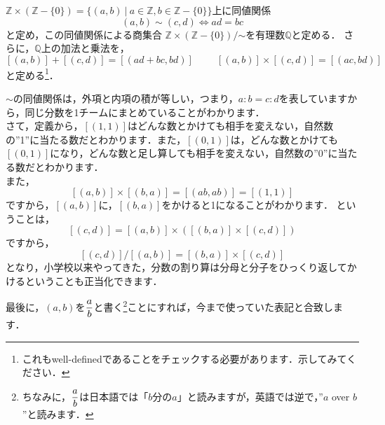 \begin{defi}[有理数]
$\mathbb{Z}\times(\mathbb{Z}-\{0\})=\{(a,b)\ |\
 a\in\mathbb{Z},b\in\mathbb{Z}-\{0\}\}$上に同値関係
 \[
  (a,b)\sim(c,d)\Leftrightarrow ad=bc
 \]
 と定め，この同値関係による商集合
 $\mathbb{Z}\times(\mathbb{Z}-\{0\})/\mathord{\sim}$を有理数$\mathbb{Q}$と定める．
 さらに，$\mathbb{Q}$上の加法と乗法を，
 \[
  [(a,b)]+[(c,d)]=[(ad+bc,bd)]\hspace{1cm}[(a,b)]\times[(c,d)]=[(ac,bd)]
 \]
 と定める\footnote{これもwell-definedであることをチェックする必要があります．示してみてください．}．
\end{defi}

$\sim$の同値関係は，外項と内項の積が等しい，つまり，$a:b=c:d$を表していますから，同じ分数を1チームにまとめていることがわかります．\\
さて，定義から，$[(1,1)]$はどんな数とかけても相手を変えない，自然数の''1''に当たる数だとわかります．また，$[(0,1)]$は，どんな数とかけても$[(0,1)]$になり，どんな数と足し算しても相手を変えない，自然数の''0''に当たる数だとわかります．\\
また，
\[
 [(a,b)]\times[(b,a)]=[(ab,ab)]=[(1,1)]
\]
ですから，$[(a,b)]$に，$[(b,a)]$をかけると1になることがわかります．
ということは，
\[
 [(c,d)]=[(a,b)]\times([(b,a)]\times[(c,d)])
\]
ですから，
\[
 [(c,d)]/[(a,b)]=[(b,a)]\times[(c,d)]
\]
となり，小学校以来やってきた，分数の割り算は分母と分子をひっくり返してかけるということも正当化できます．

最後に，$(a,b)$を$\displaystyle\frac{a}{b}$と書く\footnote{ちなみに，$\displaystyle\frac{a}{b}$は日本語では「$b$分の$a$」と読みますが，英語では逆で，''$a$ over $b$''と読みます．}ことにすれば，今まで使っていた表記と合致します．


